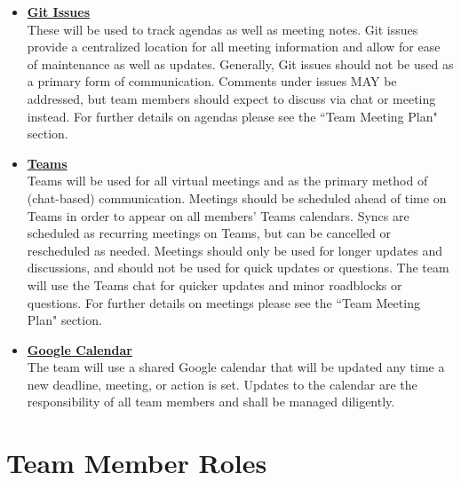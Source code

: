 \documentclass{article}
\begin{document}
\begin{itemize}
	\item \textbf{\underline{Git Issues}} \\
	These will be used to track agendas as well as meeting notes. 
	Git issues provide a centralized location for all meeting information and allow for ease of maintenance as well as updates. 
	Generally, Git issues should not be used as a primary form of communication.
	Comments under issues MAY be addressed, but team members should expect to discuss via chat or meeting instead.
	For further details on agendas please see the ``Team Meeting Plan" section.\\

	\item \textbf{\underline{Teams}} \\
	Teams will be used for all virtual meetings and as the primary method of (chat-based) communication.
	Meetings should be scheduled ahead of time on Teams in order to appear on all members' Teams calendars.
	Syncs are scheduled as recurring meetings on Teams, but can be cancelled or rescheduled as needed.
	Meetings should only be used for longer updates and discussions, and should not be used for quick updates or questions.
	The team will use the Teams chat for quicker updates and minor roadblocks or questions.
	For further details on meetings please see the ``Team Meeting Plan" section. \\
	
	\item \textbf{\underline{Google Calendar}} \\
	The team will use a shared Google calendar that will be updated any time a new deadline, meeting, or action is set. 
	Updates to the calendar are the responsibility of all team members and shall be managed diligently. \\

\end{itemize}



\section{Team Member Roles}
\end{document}

